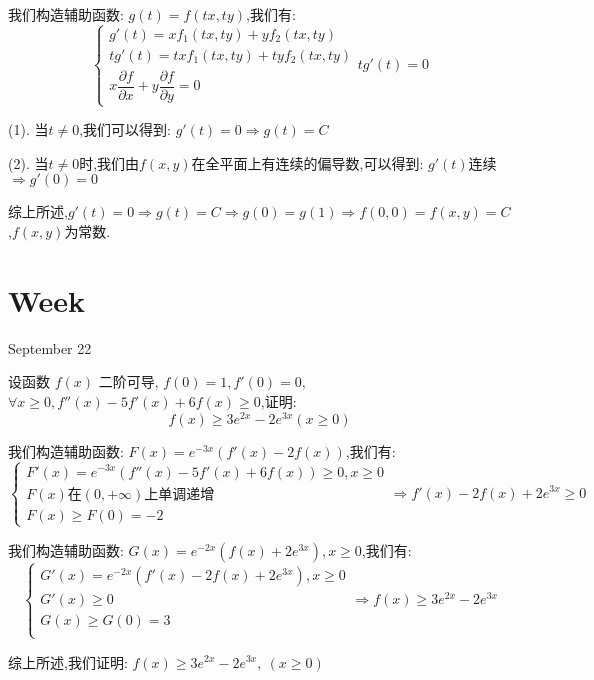 \begin{solution}

	我们构造辅助函数:  $g(t)=f(tx,ty)$,我们有:  
	$$\left\lbrace
	\begin{array}{l}
		g'(t)=xf_{1}(tx,ty)+yf_{2}(tx,ty)\\
		tg'(t)=txf_{1}(tx,ty)+tyf_{2}(tx,ty)\\
		x\dfrac{\partial f}{\partial x}+y\dfrac{\partial f}{\partial y}=0
	\end{array}
	\right. tg'(t)=0$$
	
	(1). 当$t\neq 0$,我们可以得到:  $g'(t)=0\Rightarrow g(t)=C$
	
	(2). 当$t\neq 0$时,我们由$f(x,y)$在全平面上有连续的偏导数,可以得到:  $g'(t)$连续$\Rightarrow g'(0)=0$
	
	综上所述,$g'(t)=0\Rightarrow g(t)=C\Rightarrow g(0)=g(1)\Rightarrow f(0,0)=f(x,y)=C$,$f(x,y)$为常数.
\end{solution}


\section{Week }
\textcolor{purplea}{September 22}

\begin{example}[][Exam: 35.4.1]
	设函数 $f(x)$ 二阶可导, $f(0)=1, f'(0)=0$, $\forall x\geq 0, f''(x)-5f'(x)+6f(x)\geq 0$,证明: 
	$$f(x)\geq 3e^{2x}-2e^{3x} (x\geq 0)$$
\end{example}

\begin{solution}

	我们构造辅助函数:  $F(x)=e^{-3x}(f'(x)-2f(x))$,我们有:  
	$$\left\lbrace
	\begin{array}{l}
		F'(x)=e^{-3x}(f''(x)-5f'(x)+6f(x))\geq 0,x\geq 0\\
		F(x)\text{在}(0,+\infty)\text{上单调递增}\\
		F(x)\geq F(0)=-2
	\end{array}
	\right. \Rightarrow f'(x)-2f(x)+2e^{3x}\geq 0$$
	
	我们构造辅助函数:  $G(x)=e^{-2x}(f(x)+2e^{3x}),x\geq 0$,我们有:  
	$$\left\lbrace
	\begin{array}{l}
		G'(x)=e^{-2x}(f'(x)-2f(x)+2e^{3x}),x\geq 0\\
		G'(x)\geq 0\\
		G(x)\geq G(0)=3\\
	\end{array}
	\right. \Rightarrow f(x)\geq 3e^{2x}-2e^{3x}$$
	
	综上所述,我们证明:  $f(x)\geq 3e^{2x}-2e^{3x},\ (x\geq 0)$
\end{solution}

